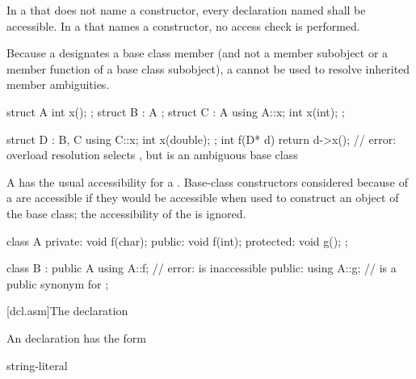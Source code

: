 \pnum
{}%
In a  that does not name a constructor,
every declaration named shall be accessible.
In a  that names a constructor,
no access check is performed.

\pnum
\begin{note}
Because a  designates a base class member
(and not a member subobject or a member function of a base class
subobject), a  cannot be used to resolve
inherited member ambiguities.
\begin{example}
\begin{codeblock}
struct A { int x(); };
struct B : A { };
struct C : A {
  using A::x;
  int x(int);
};

struct D : B, C {
  using C::x;
  int x(double);
};
int f(D* d) {
  return d->x();    // error: overload resolution selects , but  is an ambiguous base class
}
\end{codeblock}
\end{example}
\end{note}

\pnum
A  has the usual
accessibility for a .
Base-class constructors considered because of a 
are accessible if they would be accessible
when used to construct an object of the base class;
the accessibility of the  is ignored.
\begin{example}
\begin{codeblock}
class A {
private:
    void f(char);
public:
    void f(int);
protected:
    void g();
};

class B : public A {
  using A::f;       // error:  is inaccessible
public:
  using A::g;       //  is a public synonym for 
};
\end{codeblock}
\end{example}

[dcl.asm]{The  declaration}%
%
%

\pnum
An  declaration has the form
\begin{bnf}
\br
      \terminal{(} string-literal \terminal{)} \terminal{;}
\end{bnf}

